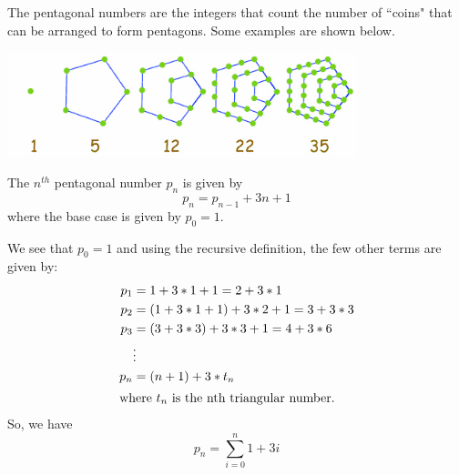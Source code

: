 The pentagonal numbers are the integers that count the
number of ``coins" that can be arranged to form pentagons.
Some examples are shown below.

\includegraphics[width=4in]{images/pentagonal-numbers.jpg}

\begin{questions}
    \begin{solution}
        The $n^{th}$ pentagonal number $p_n$ is given by
        $$p_{n}=p_{n-1} + 3n +1$$
        where the base case is given by $p_0=1$.
    \end{solution}

    \begin{solution}
        We see that $p_0 = 1$ and using the recursive
        definition, the few other terms are given by:
        \begin{align*}
            p_1 &= 1 +3*1+1=2+3*1\\
            p_2 &= \left(1+3*1+1\right) +3*2+1
            =3+3*3\\
            p_3 &= \left(3+3*3\right)+3*3+1
            =4+3*6\\
            &\vdots\\
            p_n &= (n+1)+3*t_n\\
            \shortintertext{where $t_n$ is the nth triangular
            number.}
        \end{align*}
        So, we have
        $$p_n = \sum_{i=0}^n{1+3i}$$
    \end{solution}


\end{questions}
